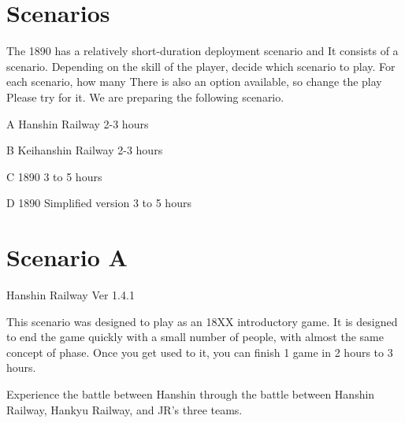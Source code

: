 \documentclass{article}
\begin{document}
\begin{CJK}{UTF8}{min}


\section*{Scenarios}

The 1890 has a relatively short-duration deployment scenario and It
consists of a scenario. Depending on the skill of the player, decide
which scenario to play. For each scenario, how many There is also an
option available, so change the play Please try for it. We are
preparing the following scenario.

A Hanshin Railway 2-3 hours

B Keihanshin Railway 2-3 hours

C 1890 3 to 5 hours

D 1890 Simplified version 3 to 5 hours








\section*{Scenario A}
Hanshin Railway Ver 1.4.1

This scenario was designed to play as an 18XX introductory game. It is
designed to end the game quickly with a small number of people, with
almost the same concept of phase. Once you get used to it, you can
finish 1 game in 2 hours to 3 hours.

Experience the battle between Hanshin through the battle between
Hanshin Railway, Hankyu Railway, and JR's three teams.


\end{CJK}
\end{document}
